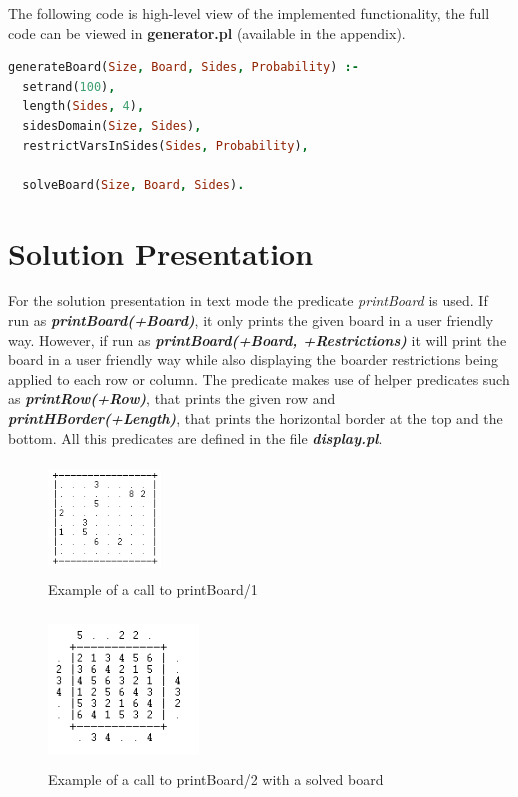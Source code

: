 \documentclass{llncs}
\begin{document}
The following code is high-level view of the implemented functionality, the full code can be viewed in \textbf{generator.pl} (available in the appendix).

\begin{lstlisting}[language=Prolog]
generateBoard(Size, Board, Sides, Probability) :-
  setrand(100),
  length(Sides, 4),
  sidesDomain(Size, Sides),
  restrictVarsInSides(Sides, Probability),

  solveBoard(Size, Board, Sides).
\end{lstlisting}

%
\section{Solution Presentation}

For the solution presentation in text mode the predicate \textit{printBoard} is used. If run as \textbf{\textit{printBoard(+Board)}}, it only prints the given board in a user friendly way. However, if run as \textbf{\textit{printBoard(+Board, +Restrictions)}} it will print the board in a user friendly way while also displaying the boarder restrictions being applied to each row or column. The predicate makes use of helper predicates such as \textbf{\textit{printRow(+Row)}}, that prints the given row and \textbf{\textit{printHBorder(+Length)}}, that prints the horizontal border at the top and the bottom. All this predicates are defined in the file \textbf{\textit{display.pl}}.

\begin{figure}[h!]
\begin{center}
\includegraphics[height=3cm,width=3cm]{images/printBoard1.png}
\caption{Example of a call to printBoard/1}
\label{Figure 3}
\end{center}
\end{figure}

\begin{figure}[h!]
\begin{center}
\includegraphics[height=4cm,width=4cm]{images/printBoard21.png}
\caption{Example of a call to printBoard/2 with a solved board}
\label{Figure 4}
\end{center}
\end{figure}
\end{document}
